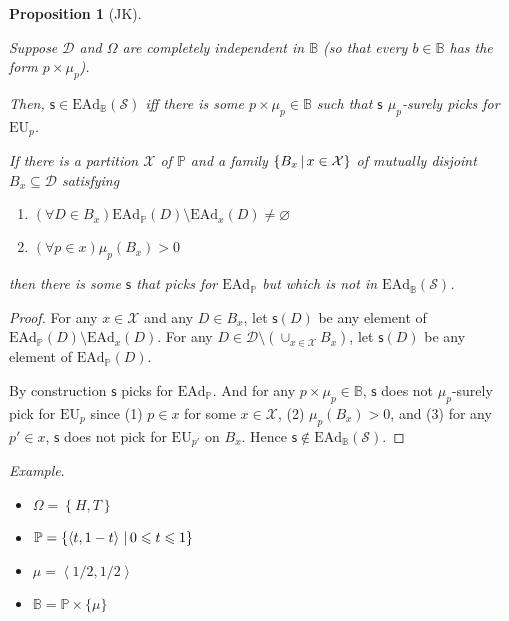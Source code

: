 \documentclass[a4paper]{article}
\newtheorem{proposition}[theorem]{Proposition}
\newcommand\X{\mathcal{X}}
\renewcommand\P{\mathbb{P}} %
\newcommand\EU{\mathrm{EU}}
\newcommand\EAd{\mathrm{EAd}}
\newcommand{\D}{\mathcal{D}}
\newcommand{\Decs}{\mathcal{D}}
\renewcommand\S{\mathcal{S}}
\newcommand\s{\mathsf{s}}
\newcommand{\IB}{\mathbb{B}}
\newcommand{\IP}{\P}
\newcommand{\Strategies}{\S}
\newcommand\SetDelimiter[1][]{
	\nonscript\,#1\vert \allowbreak \nonscript\,\mathopen{}}
\providecommand\given{\SetDelimiter}
\renewcommand{\leq}{\leqslant}
\newenvironment{CCM rewritten}
{\begingroup\color{blue}} %
{\endgroup}              %
\begin{document}
\begin{proposition}[JK]\label{thm:ead-existsimpermissible[indep]:JK-1}

Suppose $\D$ and $\Omega$ are completely independent in $\IB$ (so that every $b\in\IB$ has the form $p\times\mu_p$).
	
	Then, $\s\in\EAd_\IB(\Strategies)$ iff there is some $p\times \mu_p\in\IB$ such that $\s$ $\mu_p$-surely picks for $\EU_p$. 
	
	
	
If there is a partition $\X$ of $\IP$ and a family $\left\{ B_x \given x\in\X\right\}$ of mutually disjoint $B_x\subseteq\Decs$ satisfying
\begin{enumerate}
\item $(\forall D\in B_x)\EAd_\IP(D)\setminus\EAd_x(D)\not=\varnothing$
\item $(\forall p\in x)\mu_p(B_x)>0$
\end{enumerate}
then there is some $\s$ that picks for $\EAd_\IP$ but which is not in $\EAd_\IB(\Strategies)$.

\end{proposition}
\begin{proof}

For any $x\in\X$ and any $D\in B_x$, let $\s(D)$ be any element of $\EAd_\IP(D)\setminus\EAd_x(D)$. For any $D\in\Decs\setminus\left(\cup_{x\in\X}B_x\right)$, let $\s(D)$ be any element of $\EAd_\IP(D)$.

By construction $\s$ picks for $\EAd_\IP$. And for any $p\times \mu_p\in\IB$, $\s$ does not $\mu_p$-surely pick for $\EU_p$ since (1) $p\in x$ for some $x\in \X$, (2) $\mu_p(B_x)>0$, and (3) for any $p'\in x$, $\s$ does not pick for $\EU_{p'}$ on $B_x$. Hence $\s\not\in\EAd_\IB(\Strategies)$.

\end{proof}



\textit{Example}. 

\begin{itemize}
\item $\Omega=\left\{ H, T\right\}$

\item $\IP=\left\{ \left<t, 1-t\right>\given 0\leq t\leq 1\right\}$

\item $\mu= \left<1/2,1/2\right>$


\item $\IB=\IP\times\{\mu\}$
\end{itemize}
\end{document}
